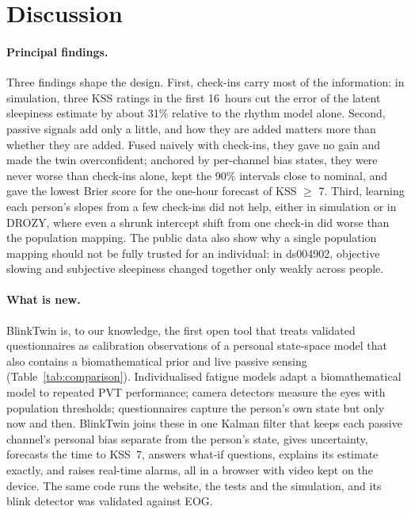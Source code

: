 \section{Discussion}
\label{sec:discussion}

\paragraph{Principal findings.} Three findings shape the design. First, check-ins carry most of the information: in simulation, three KSS ratings in the first 16~hours cut the error of the latent sleepiness estimate by about 31\% relative to the rhythm model alone. Second, passive signals add only a little, and how they are added matters more than whether they are added. Fused naively with check-ins, they gave no gain and made the twin overconfident; anchored by per-channel bias states, they were never worse than check-ins alone, kept the 90\% intervals close to nominal, and gave the lowest Brier score for the one-hour forecast of KSS $\geq$ 7. Third, learning each person's slopes from a few check-ins did not help, either in simulation or in DROZY, where even a shrunk intercept shift from one check-in did worse than the population mapping. The public data also show why a single population mapping should not be fully trusted for an individual: in ds004902, objective slowing and subjective sleepiness changed together only weakly across people.

\paragraph{What is new.} BlinkTwin is, to our knowledge, the first open tool that treats validated questionnaires as calibration observations of a personal state-space model that also contains a biomathematical prior and live passive sensing (Table~\ref{tab:comparison}). Individualised fatigue models \citep{rajaraman2008individualized,reifman2019twobalert} adapt a biomathematical model to repeated PVT performance; camera detectors measure the eyes with population thresholds; questionnaires capture the person's own state but only now and then. BlinkTwin joins these in one Kalman filter that keeps each passive channel's personal bias separate from the person's state, gives uncertainty, forecasts the time to KSS~7, answers what-if questions, explains its estimate exactly, and raises real-time alarms, all in a browser with video kept on the device. The same code runs the website, the tests and the simulation, and its blink detector was validated against EOG.

